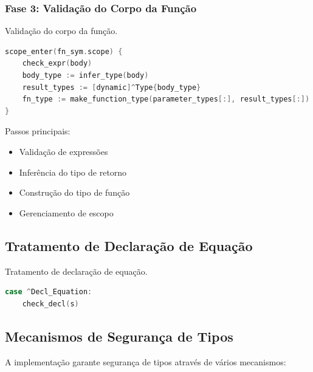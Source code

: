 \subsubsection{Fase 3: Validação do Corpo da Função}
\begin{codigo}[htb]
    \caption{\small Validação do corpo da função.}
    \label{cod-function-body-validation}
\begin{lstlisting}[language=C, numbers=none, frame=none, inputencoding=latin1]
scope_enter(fn_sym.scope) {
    check_expr(body)
    body_type := infer_type(body)
    result_types := [dynamic]^Type{body_type}
    fn_type := make_function_type(parameter_types[:], result_types[:])
}
\end{lstlisting}
\end{codigo}

Passos principais:
\begin{itemize}
    \item Validação de expressões
    \item Inferência do tipo de retorno
    \item Construção do tipo de função
    \item Gerenciamento de escopo
\end{itemize}

\subsection{Tratamento de Declaração de Equação}
\begin{codigo}[htb]
    \caption{\small Tratamento de declaração de equação.}
    \label{cod-equation-declaration}
\begin{lstlisting}[language=C, numbers=none, frame=none, inputencoding=latin1]
case ^Decl_Equation:
    check_decl(s)
\end{lstlisting}
\end{codigo}

\subsection{Mecanismos de Segurança de Tipos}
A implementação garante segurança de tipos através de vários mecanismos:


